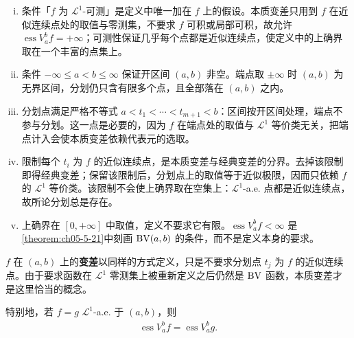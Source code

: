 \documentclass[../../main.tex]{subfiles}%
\begin{document}
\begin{remark}\label{remark:ch05-def-5-11-条件}
\begin{enumerate}[(i)]
\item 条件「$f$ 为 $\mathcal{L}^1$-可测」是定义中唯一加在 $f$ 上的假设。本质变差只用到 $f$ 在近似连续点处的取值与零测集，不要求 $f$ 可积或局部可积，故允许 $\operatorname{ess}V_a^b f=+\infty$；可测性保证几乎每个点都是近似连续点，使定义中的上确界取在一个丰富的点集上。
\item 条件 $-\infty\leqslant a<b\leqslant\infty$ 保证开区间 $(a,b)$ 非空。端点取 $\pm\infty$ 时 $(a,b)$ 为无界区间，分划仍只含有限多个点，且全部落在 $(a,b)$ 之内。
\item 分划点满足严格不等式 $a<t_1<\cdots<t_{m+1}<b$：区间按开区间处理，端点不参与分划。这一点是必要的，因为 $f$ 在端点处的取值与 $\mathcal{L}^1$ 等价类无关，把端点计入会使本质变差依赖代表元的选取。
\item 限制每个 $t_i$ 为 $f$ 的近似连续点，是本质变差与经典变差的分界。去掉该限制即得经典变差；保留该限制后，分划点上的取值等于近似极限，因而只依赖 $f$ 的 $\mathcal{L}^1$ 等价类。该限制不会使上确界取在空集上：$\mathcal{L}^1$-a.e. 点都是近似连续点，故所论分划总是存在。
\item 上确界在 $[0,+\infty]$ 中取值，定义不要求它有限。$\operatorname{ess}V_a^b f<\infty$ 是\cref{theorem:ch05-5-21}中刻画 $\mathrm{BV}(a,b)$ 的条件，而不是定义本身的要求。%
\end{enumerate}
\end{remark}

\begin{remark}\label{remark:ch05-def-5-11-变差}
$f$ 在 $(a,b)$ 上的\textbf{变差}以同样的方式定义，只是不要求分划点 $t_j$ 为 $f$ 的近似连续点。由于要求函数在 $\mathcal{L}^1$ 零测集上被重新定义之后仍然是 $\mathrm{BV}$ 函数，本质变差才是这里恰当的概念。

特别地，若 $f=g$ $\mathcal{L}^1$-a.e. 于 $(a,b)$，则
\begin{align*}
\operatorname{ess}V_a^b f=\operatorname{ess}V_a^b g.
\end{align*}
\end{remark}
\end{document}
